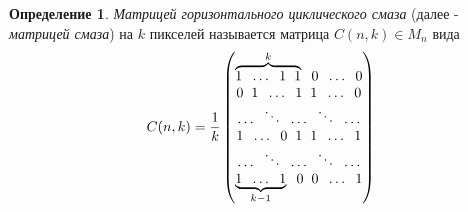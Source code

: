 \documentclass[a4paper]{article}
\theoremstyle{definition}
\newtheorem{definition}{Определение}[section]
\begin{document}
    \begin{definition}
    \label{blur matrix}
	\emph{Матрицей горизонтального циклического смаза} (далее - \emph{матрицей смаза}) на $k$ пикселей называется матрица $C(n, k) \in M_n$ вида
    $$
    C(n, k) = \frac{1}{k}\begin{pmatrix}
          \overbrace{1 \hspace*{2mm} \ldots \hspace*{2mm} 1 \hspace*{2mm} 1}^{k} \hspace*{2mm} 0 \hspace*{2mm} \ldots \hspace*{2mm} 0 \\
          0 \hspace*{2mm} 1 \hspace*{2mm} \ldots \hspace*{2mm} 1 \hspace*{2mm} 1 \hspace*{2mm} \ldots \hspace*{2mm} 0 \\
          \ldots \hspace*{2mm} \ddots \hspace*{2mm} \ldots \hspace*{2mm} \ddots \hspace*{2mm} \ldots \\
          1 \hspace*{2mm} \ldots \hspace*{2mm} 0 \hspace*{2mm} 1 \hspace*{2mm} 1 \hspace*{2mm} \ldots \hspace*{2mm} 1 \\
          \ldots \hspace*{2mm} \ddots \hspace*{2mm} \ldots \hspace*{2mm} \ddots \hspace*{2mm} \ldots\\
          \underbrace{1 \hspace*{2mm} \ldots \hspace*{2mm} 1}_{k-1} \hspace*{2mm} 0 \hspace*{2mm} 0 \hspace*{2mm} \ldots \hspace*{2mm} 1
        \end{pmatrix}
    $$
    \end{definition}
\end{document}
